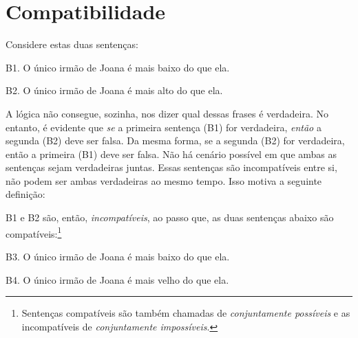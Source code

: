 
\section{Compatibilidade}
Considere estas duas sentenças:
	\begin{ebullet}
		\item[B1.] O único irmão de Joana é mais baixo do que ela.
		\item[B2.] O único irmão de Joana é mais alto do que ela.
	\end{ebullet}	
A lógica não consegue, sozinha, nos dizer qual dessas frases é verdadeira.
No entanto, é evidente que \emph{se} a primeira sentença (B1) for verdadeira, \emph{então} a segunda (B2) deve ser falsa.
Da mesma forma, se a segunda (B2) for verdadeira, então a primeira (B1) deve ser falsa.
Não há cenário possível em que ambas as sentenças sejam verdadeiras juntas.
Essas sentenças são incompatíveis entre si, não podem ser ambas verdadeiras ao mesmo tempo.
Isso motiva a seguinte definição:

B1 e B2 são, então, \emph{incompatíveis}, ao passo que, as duas sentenças abaixo são compatíveis:\footnote{
	Sentenças compatíveis são também chamadas de \textit{conjuntamente possíveis} e as incompatíveis de \textit{conjuntamente impossíveis}.}
	\begin{ebullet}
		\item[B3.] O único irmão de Joana é mais baixo do que ela.
		\item[B4.] O único irmão de Joana é mais velho do que ela.
	\end{ebullet}

